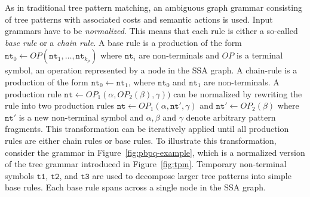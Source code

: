 As in traditional tree pattern matching, an ambiguous graph grammar
consisting of tree patterns with associated costs and semantic actions
is used. Input grammars have to be \emph{normalized}. This means that
each rule is either a so-called \emph{base rule} or a \emph{chain
  rule}. A base rule is a production of the form $\texttt{nt}_0
\leftarrow \textit{OP} ( \texttt{nt}_1, \dots, \texttt{nt}_{k_p} )$
where $\texttt{nt}_i$ are non-terminals and $\textit{OP}$ is a
terminal symbol, \ie an operation represented by a node in the SSA
graph. A chain-rule is a production of the form $\texttt{nt}_0
\leftarrow \texttt{nt}_1$, where $\texttt{nt}_0$ and $\texttt{nt}_1$
are non-terminals.  A production rule $\texttt{nt} \leftarrow
\textit{OP}_1 ( \alpha, \textit{OP}_2 (\beta), \gamma))$ can be
normalized by rewriting the rule into two production rules
$\texttt{nt} \leftarrow \textit{OP}_1 ( \alpha, \texttt{nt}' ,
\gamma)$ and $\texttt{nt}' \leftarrow \textit{OP}_2 ( \beta)$ where
$\texttt{nt}'$ is a new non-terminal symbol and $\alpha,\beta$ and
$\gamma$ denote arbitrary pattern fragments.  This transformation can
be iteratively applied until all production rules are either chain
rules or base rules.  To illustrate this transformation, consider the
grammar in Figure~\ref{fig:pbpq-example}, which is a normalized
version of the tree grammar introduced in
Figure~\ref{fig:tpm}. Temporary non-terminal symbols $\texttt{t1}$,
$\texttt{t2}$, and $\texttt{t3}$ are used to decompose larger tree
patterns into simple base rules. Each base rule spans across a single
node in the SSA graph.


